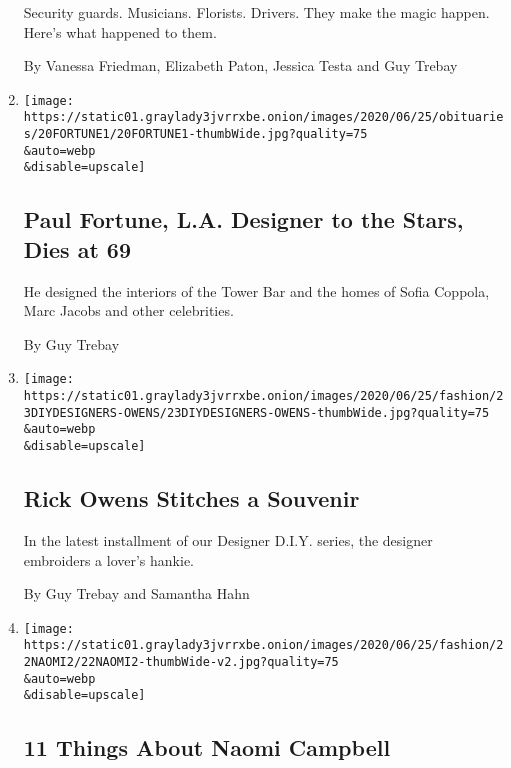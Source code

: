 \begin{enumerate}
  Security guards. Musicians. Florists. Drivers. They make the magic
  happen. Here's what happened to them.

  By Vanessa Friedman, Elizabeth Paton, Jessica Testa and Guy Trebay
\item
  \href{/2020/06/23/style/paul-fortune-la-designer-to-the-stars-dies-at-69.html}{}

  \texttt{[image: https://static01.graylady3jvrrxbe.onion/images/2020/06/25/obituaries/20FORTUNE1/20FORTUNE1-thumbWide.jpg?quality=75\\\&auto=webp\\\&disable=upscale]}

  \hypertarget{paul-fortune-la-designer-to-the-stars-dies-at-69}{%
  \subsection{Paul Fortune, L.A. Designer to the Stars, Dies at
  69}\label{paul-fortune-la-designer-to-the-stars-dies-at-69}}

  He designed the interiors of the Tower Bar and the homes of Sofia
  Coppola, Marc Jacobs and other celebrities.

  By Guy Trebay
\item
  \href{/2020/06/23/style/DIY-sewing-rick-owens-stitches-a-souvenir.html}{}

  \texttt{[image: https://static01.graylady3jvrrxbe.onion/images/2020/06/25/fashion/23DIYDESIGNERS-OWENS/23DIYDESIGNERS-OWENS-thumbWide.jpg?quality=75\\\&auto=webp\\\&disable=upscale]}

  \hypertarget{rick-owens-stitches-a-souvenir}{%
  \subsection{Rick Owens Stitches a
  Souvenir}\label{rick-owens-stitches-a-souvenir}}

  In the latest installment of our Designer D.I.Y. series, the designer
  embroiders a lover's hankie.

  By Guy Trebay and Samantha Hahn
\item
  \href{/2020/06/22/style/11-things-about-naomi-campbell.html}{}

  \texttt{[image: https://static01.graylady3jvrrxbe.onion/images/2020/06/25/fashion/22NAOMI2/22NAOMI2-thumbWide-v2.jpg?quality=75\\\&auto=webp\\\&disable=upscale]}

  \hypertarget{11-things-about-naomi-campbell}{%
  \subsection{11 Things About Naomi
  Campbell}\label{11-things-about-naomi-campbell}}


\end{enumerate}
